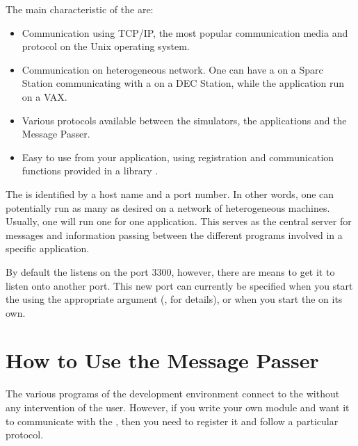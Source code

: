 The main characteristic of the \MP{} are:

\begin{itemize}

\item Communication using TCP/IP, the most popular communication media
and protocol on the  Unix operating system.

\item Communication on heterogeneous network. One can have a \XPK{}
on a Sparc Station communicating with a \CPK{} on a DEC Station,
while the application run on a VAX.

\item Various protocols available between the simulators, the
applications and the Message Passer.

\item Easy to use from your application, using registration and
communication functions provided in a library .

\end{itemize}

The \MP{} is identified by a host name and a port number. In other words,
one can potentially run as many \MP{} as desired on a network of
heterogeneous machines. Usually, one will run one \MP{} for one \COPRS{}
application. This \MP{} serves as the central server for messages and
information passing between the different programs involved in a
specific application.

By default the \MP{} listens on the port 3300, however, there are means to get
it to listen onto another port. This new port can currently be specified when
you start the \OPRSS{} using the appropriate argument (, for details), or when you start the \MP{} on its own.

\chapter{How to Use the Message Passer}

The various programs of the \COPRS{} development environment connect to the
\MP{} without any intervention of the user. However, if you write your own
module and want it to communicate with the \MP{}, then you need to
register it and follow a particular protocol.

